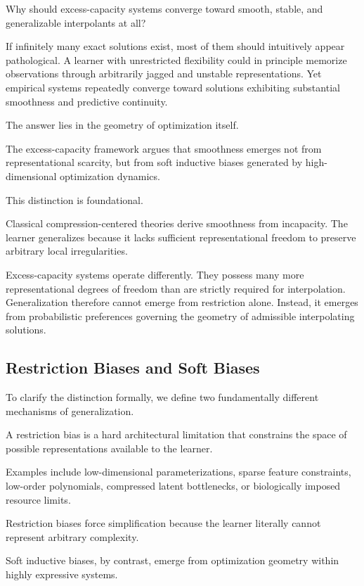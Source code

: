 \documentclass[12pt,a4paper]{article}
\begin{document}
Why should excess-capacity systems converge toward smooth, stable, and generalizable interpolants at all?

If infinitely many exact solutions exist, most of them should intuitively appear pathological. A learner with unrestricted flexibility could in principle memorize observations through arbitrarily jagged and unstable representations. Yet empirical systems repeatedly converge toward solutions exhibiting substantial smoothness and predictive continuity.

The answer lies in the geometry of optimization itself.

The excess-capacity framework argues that smoothness emerges not from representational scarcity, but from soft inductive biases generated by high-dimensional optimization dynamics.

This distinction is foundational.

Classical compression-centered theories derive smoothness from incapacity. The learner generalizes because it lacks sufficient representational freedom to preserve arbitrary local irregularities.

Excess-capacity systems operate differently. They possess many more representational degrees of freedom than are strictly required for interpolation. Generalization therefore cannot emerge from restriction alone. Instead, it emerges from probabilistic preferences governing the geometry of admissible interpolating solutions.

\subsection{Restriction Biases and Soft Biases}

To clarify the distinction formally, we define two fundamentally different mechanisms of generalization.

A restriction bias is a hard architectural limitation that constrains the space of possible representations available to the learner.

Examples include low-dimensional parameterizations, sparse feature constraints, low-order polynomials, compressed latent bottlenecks, or biologically imposed resource limits.

Restriction biases force simplification because the learner literally cannot represent arbitrary complexity.

Soft inductive biases, by contrast, emerge from optimization geometry within highly expressive systems.
\end{document}
